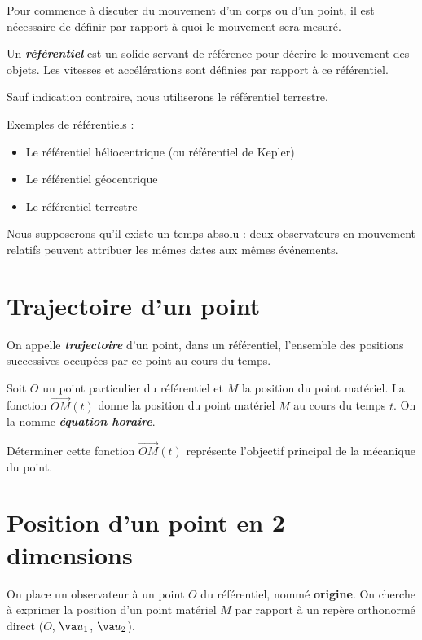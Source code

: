 \documentclass[
  12pt,
  openany]{book}
\providecommand{\tightlist}{%
  \setlength{\itemsep}{0pt}\setlength{\parskip}{0pt}}
\theoremstyle{plain}
\theoremstyle{remark}
\begin{document}
Pour commence à discuter du mouvement d'un corps ou d'un point, il est
nécessaire de définir par rapport à quoi le mouvement sera mesuré.

Un \textbf{\emph{référentiel}} est un solide servant de référence pour
décrire le mouvement des objets. Les vitesses et accélérations sont
définies par rapport à ce référentiel.

Sauf indication contraire, nous utiliserons le référentiel terrestre.

Exemples de référentiels :

\begin{itemize}
\tightlist
\item
  Le référentiel héliocentrique (ou référentiel de Kepler)
\item
  Le référentiel géocentrique
\item
  Le référentiel terrestre
\end{itemize}

Nous supposerons qu'il existe un temps absolu : deux observateurs en
mouvement relatifs peuvent attribuer les mêmes dates aux mêmes
événements.

\section{Trajectoire d'un point}\label{trajectoire-dun-point}

On appelle \textbf{\emph{trajectoire}} d'un point, dans un référentiel,
l'ensemble des positions successives occupées par ce point au cours du
temps.

Soit \(O\) un point particulier du référentiel et \(M\) la position du
point matériel. La fonction \(\overrightarrow{OM}(t)\) donne la position
du point matériel \(M\) au cours du temps \(t\). On la nomme
\textbf{\emph{équation horaire}}.

Déterminer cette fonction \(\overrightarrow{OM}(t)\) représente
l'objectif principal de la mécanique du point.

\section{Position d'un point en 2
dimensions}\label{position-dun-point-en-2-dimensions}

On place un observateur à un point \(O\) du référentiel, nommé
\textbf{origine}. On cherche à exprimer la position d'un point matériel
\(M\) par rapport à un repère orthonormé direct (\(O\), \(\va u_1\),
\(\va u_2\)).
\end{document}
